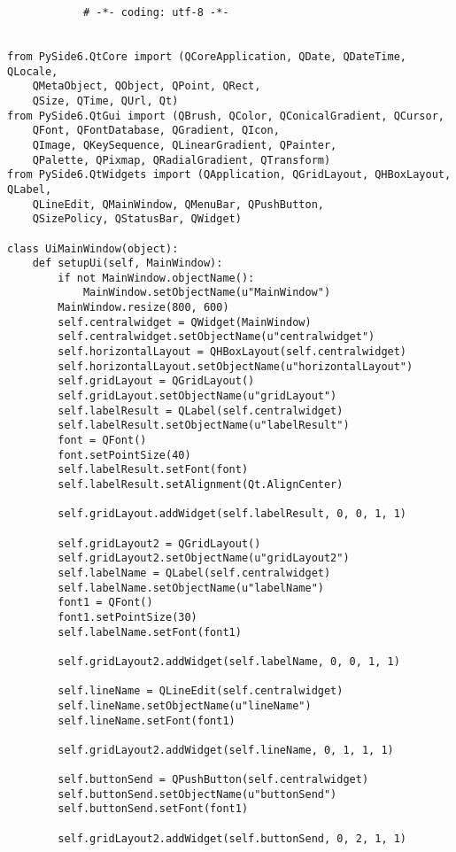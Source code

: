 \documentclass[12pt,a4paper]{article}
\begin{document}
        \begin{lstlisting}
            # -*- coding: utf-8 -*-


from PySide6.QtCore import (QCoreApplication, QDate, QDateTime, QLocale,
    QMetaObject, QObject, QPoint, QRect,
    QSize, QTime, QUrl, Qt)
from PySide6.QtGui import (QBrush, QColor, QConicalGradient, QCursor,
    QFont, QFontDatabase, QGradient, QIcon,
    QImage, QKeySequence, QLinearGradient, QPainter,
    QPalette, QPixmap, QRadialGradient, QTransform)
from PySide6.QtWidgets import (QApplication, QGridLayout, QHBoxLayout, QLabel,
    QLineEdit, QMainWindow, QMenuBar, QPushButton,
    QSizePolicy, QStatusBar, QWidget)

class UiMainWindow(object):
    def setupUi(self, MainWindow):
        if not MainWindow.objectName():
            MainWindow.setObjectName(u"MainWindow")
        MainWindow.resize(800, 600)
        self.centralwidget = QWidget(MainWindow)
        self.centralwidget.setObjectName(u"centralwidget")
        self.horizontalLayout = QHBoxLayout(self.centralwidget)
        self.horizontalLayout.setObjectName(u"horizontalLayout")
        self.gridLayout = QGridLayout()
        self.gridLayout.setObjectName(u"gridLayout")
        self.labelResult = QLabel(self.centralwidget)
        self.labelResult.setObjectName(u"labelResult")
        font = QFont()
        font.setPointSize(40)
        self.labelResult.setFont(font)
        self.labelResult.setAlignment(Qt.AlignCenter)

        self.gridLayout.addWidget(self.labelResult, 0, 0, 1, 1)

        self.gridLayout2 = QGridLayout()
        self.gridLayout2.setObjectName(u"gridLayout2")
        self.labelName = QLabel(self.centralwidget)
        self.labelName.setObjectName(u"labelName")
        font1 = QFont()
        font1.setPointSize(30)
        self.labelName.setFont(font1)

        self.gridLayout2.addWidget(self.labelName, 0, 0, 1, 1)

        self.lineName = QLineEdit(self.centralwidget)
        self.lineName.setObjectName(u"lineName")
        self.lineName.setFont(font1)

        self.gridLayout2.addWidget(self.lineName, 0, 1, 1, 1)

        self.buttonSend = QPushButton(self.centralwidget)
        self.buttonSend.setObjectName(u"buttonSend")
        self.buttonSend.setFont(font1)

        self.gridLayout2.addWidget(self.buttonSend, 0, 2, 1, 1)



\end{lstlisting}
\end{document}
